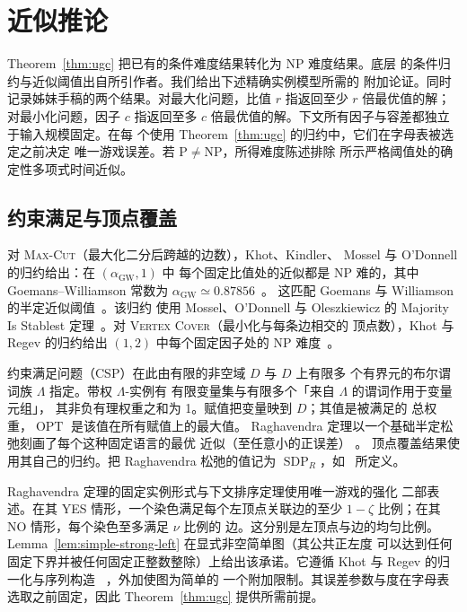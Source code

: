 \section{近似推论}\label{sec:consequences}

Theorem~\ref{thm:ugc} 把已有的条件难度结果转化为 NP 难度结果。底层
的条件归约与近似阈值出自所引作者。我们给出下述精确实例模型所需的
附加论证。同时记录姊妹手稿的两个结果。对最大化问题，比值 \(r\)
指返回至少 \(r\) 倍最优值的解；对最小化问题，因子 \(c\) 指返回至多
\(c\) 倍最优值的解。下文所有因子与容差都独立于输入规模固定。在每
个使用 Theorem~\ref{thm:ugc} 的归约中，它们在字母表被选定之前决定
唯一游戏误差。若 \(\mathrm P\ne\mathrm{NP}\)，所得难度陈述排除
所示严格阈值处的确定性多项式时间近似。

\subsection{约束满足与顶点覆盖}

对 \textsc{Max-Cut}（最大化二分后跨越的边数），Khot、Kindler、
Mossel 与 O'Donnell 的归约给出：在 \((\alpha_{\mathrm{GW}},1)\) 中
每个固定比值处的近似都是 NP 难的，其中 Goemans--Williamson 常数为
\(\alpha_{\mathrm{GW}}\simeq0.87856\)~\cite[Theorem~1]{KKMO07}。
这匹配 Goemans 与 Williamson 的半定近似阈值~\cite{GW95}。该归约
使用 Mossel、O'Donnell 与 Oleszkiewicz 的 Majority Is Stablest
定理~\cite{MOO10}。对 \textsc{Vertex Cover}（最小化与每条边相交的
顶点数），Khot 与 Regev 的归约给出 \((1,2)\) 中每个固定因子处的
NP 难度~\cite{KhotRegev2008}。

约束满足问题（CSP）在此由有限的非空域 \(D\) 与 \(D\) 上有限多
个有界元的布尔谓词族 \(\Lambda\) 指定。带权 \(\Lambda\)-实例有
有限变量集与有限多个「来自 \(\Lambda\) 的谓词作用于变量元组」，
其非负有理权重之和为 1。赋值把变量映到 \(D\)；其值是被满足的
总权重，\(\operatorname{OPT}\) 是该值在所有赋值上的最大值。
Raghavendra 定理以一个基础半定松弛刻画了每个这种固定语言的最优
近似（至任意小的正误差）
\cite[Theorem~1.1 and Corollary~1.3]{Raghavendra08}。
顶点覆盖结果使用其自己的归约。把 Raghavendra 松弛的值记为
\(\operatorname{SDP}_{R}\)，如~\cite[Section~4.5]{RaghavendraThesis09}
所定义。

Raghavendra 定理的固定实例形式与下文排序定理使用唯一游戏的强化
二部表述。在其 YES 情形，一个染色满足每个左顶点关联边的至少
\(1-\zeta\) 比例；在其 NO 情形，每个染色至多满足 \(\nu\) 比例的
边。这分别是左顶点与边的均匀比例。
Lemma~\ref{lem:simple-strong-left} 在显式非空简单图（其公共正左度
可以达到任何固定下界并被任何固定正整数整除）上给出该承诺。它遵循
Khot 与 Regev 的归一化与序列构造
~\cite[Lemmas~3.3, 3.4, and~3.6]{KhotRegev2008}，外加使图为简单的
一个附加限制。其误差参数与度在字母表选取之前固定，因此
Theorem~\ref{thm:ugc} 提供所需前提。

